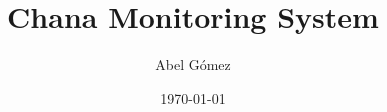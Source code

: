 \documentclass[twoside]{report}
\title{%
  Chana Monitoring System
}
\author{
  Abel Gómez
}
\date{
  \today
}
\begin{document}
\maketitle

\tableofcontents

%


%




%

\appendix

\cleardoublepage






% 
% 
% 
% 
% 
% 


\makeback
\end{document}
